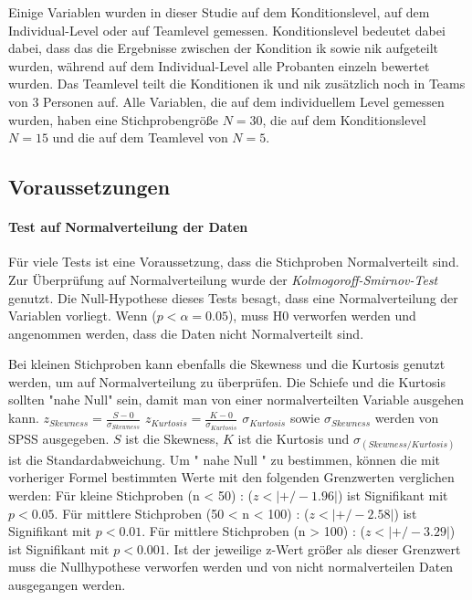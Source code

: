\documentclass[a4paper,11pt]{article}%
\renewcommand{\\}{\vspace*{0.5\baselineskip} \newline}
\begin{document}
Einige Variablen wurden in dieser Studie auf dem Konditionslevel, auf dem Individual-Level oder auf Teamlevel gemessen.
Konditionslevel bedeutet dabei dabei, dass das die Ergebnisse zwischen der Kondition \ac{ik} sowie \ac{nik} aufgeteilt wurden, während auf dem Individual-Level alle Probanten einzeln bewertet wurden. Das Teamlevel teilt die Konditionen \ac{ik} und \ac{nik} zusätzlich noch in Teams von 3 Personen auf.  Alle Variablen, die auf dem individuellem Level gemessen wurden, haben eine Stichprobengröße $N = 30$, die auf dem Konditionslevel $ N = 15$ und die auf dem Teamlevel von $N = 5$.

	\subsection{Voraussetzungen}
	
\paragraph{Test auf Normalverteilung der Daten}
Für viele Tests ist eine Voraussetzung, dass die Stichproben Normalverteilt sind. Zur Überprüfung auf Normalverteilung wurde der \textit{Kolmogoroff-Smirnov-Test} genutzt. Die Null-Hypothese dieses Tests besagt, dass eine Normalverteilung der Variablen vorliegt. Wenn ($p < \alpha = 0.05$), muss H0 verworfen werden und angenommen werden, dass die Daten nicht Normalverteilt sind.

Bei kleinen Stichproben kann ebenfalls die Skewness und die Kurtosis genutzt werden, um auf Normalverteilung zu überprüfen. 
Die Schiefe und die Kurtosis sollten "nahe Null" sein, damit man von einer normalverteilten Variable ausgehen kann. \\$ z_{Skewness} = \frac{S-0}{\sigma_{Skewness}} $ \\ $ z_{Kurtosis} = \frac{K-0}{\sigma_{Kurtosis}} $ \\
$\sigma_{Kurtosis}$ sowie $\sigma_{Skewness}$ werden von SPSS ausgegeben. $S$ ist die Skewness, $K$ ist die Kurtosis und ${\sigma_{(Skewness/Kurtosis)}}$ ist die Standardabweichung.
Um " nahe Null " zu bestimmen, können die mit vorheriger Formel bestimmten Werte mit den folgenden Grenzwerten verglichen werden:
Für kleine Stichproben (n < 50) : ($z < |+/-1.96|$) ist Signifikant mit $p<0.05$. \newline
Für mittlere Stichproben (50 < n < 100) : ($z < |+/-2.58|$) ist Signifikant mit $p<0.01$. \newline
Für mittlere Stichproben (n > 100) : ($z < |+/-3.29|$) ist Signifikant mit $p<0.001$. \newline
Ist der jeweilige z-Wert größer als dieser Grenzwert muss die Nullhypothese verworfen werden und von nicht normalverteilen Daten ausgegangen werden.
\citep[p.184]{field2013discovering} \\
\end{document}
